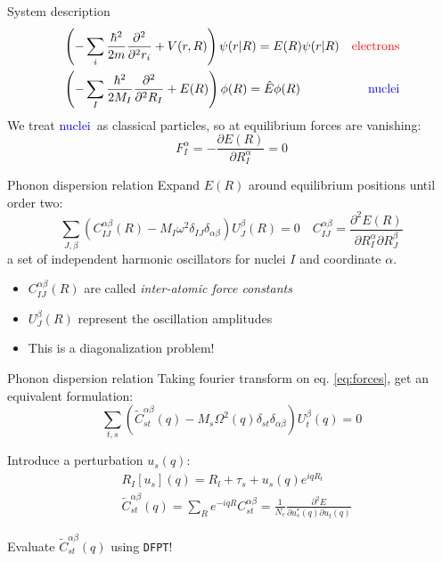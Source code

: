 \documentclass[dvipsnames]{beamer}
\newcommand{\diff}[2]{\frac{\partial #1}{\partial #2}}
\newcommand{\ddiffx}[1]{\frac{\partial^2 }{\partial^2 #1}}
\newcommand{\ddiffd}[3]{\frac{\partial^2 #1}{\partial #2 \partial #3}}
\newcommand{\electrons}{\textcolor{red}{electrons}}
\newcommand{\nuclei}{\textcolor{blue}{nuclei}}
\begin{document}
		\begin{frame}{System description}
		\begin{align*}
		&\left(-\sum_i\frac{\hbar^2}{2m} \ddiffx{r_i} + V(r,R) \right) \psi(r|R) = E(R) \psi(r|R) & \text{\electrons} \\
		&\left(-\sum_I\frac{\hbar^2}{2M_I} \ddiffx{R_I} + E(R) \right) \phi(R) = \hat{E} \phi(R) & \text{\nuclei} 
		\end{align*}
		We treat \nuclei ~as classical particles, so at equilibrium forces are vanishing:
		\[F_I^\alpha = - \diff{E(R)}{R_I^\alpha} = 0 \]
		\end{frame}
		
		\begin{frame}{Phonon dispersion relation}
		Expand $E(R)$ around equilibrium positions until order two:
	    \begin{equation} \label{eq:forces}
	    \sum_{J,\beta}(C_{IJ}^{\alpha\beta}(R) - M_I \omega^2 \delta_{IJ} \delta_{\alpha\beta})U_J^\beta(R) = 0 \quad C_{IJ}^{\alpha\beta} = \ddiffd{E(R)}{R_I^\alpha}{R_J^\beta}
	    \end{equation}
	    a set of independent harmonic oscillators for nuclei $I$ and coordinate $\alpha$. 
	    \begin{itemize}
	    \item $C_{IJ}^{\alpha\beta}(R)$ are called \textit{inter-atomic force constants}
	    \item $U_J^\beta(R)$ represent the oscillation amplitudes
	    \item \alert{This is a diagonalization problem!}
	    \end{itemize}
		\end{frame}
		
		\begin{frame}{Phonon dispersion relation}
		Taking fourier transform on eq. \ref{eq:forces}, get an equivalent formulation:
	    \[ \sum_{t,s}(\tilde{C}_{st}^{\alpha\beta}(q) - M_s \Omega^2(q) \delta_{st} \delta_{\alpha\beta})U_t^\beta(q) = 0\]
	    \begin{block}{Introduce a perturbation $u_s(q)$:}
	    \begin{align*}
	    &R_I[u_s](q) = R_l + \tau_s + u_s(q)e^{iqR_l} \\
	    &\tilde{C}_{st}^{\alpha\beta}(q) = \sum_R e^{-iqR}C_{st}^{\alpha\beta} = \frac{1}{N_c} \ddiffd{E}{u_s^\ast(q)}{u_t(q)} 
	    \end{align*}
	    \end{block}
	    \alert{Evaluate $\tilde{C}_{st}^{\alpha\beta}(q)$ using \texttt{DFPT}!}
		\end{frame}
		
\end{document}

